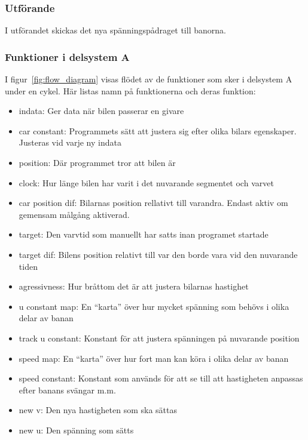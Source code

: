     \subsubsection{Utförande}

    	I utförandet skickas det nya spänningspådraget till banorna. 
	

    \subsubsection{Funktioner i delsystem A}
	I figur~\ref{fig:flow_diagram}  visas flödet av de funktioner som sker i delsystem A under en cykel.
	Här listas namn på funktionerna och deras funktion:
	\begin{itemize}
 		\item indata: Ger data när bilen passerar en givare
		\item car constant: Programmets sätt att justera sig efter olika bilars egenskaper. Justeras vid varje ny indata
 		\item position: Där programmet tror att bilen är
 		\item clock: Hur länge bilen har varit i det nuvarande segmentet och varvet
		\item car position dif: Bilarnas position rellativt till varandra. Endast aktiv om gemensam målgång aktiverad.
		\item target: Den varvtid som manuellt har satts inan programet startade
		\item target dif: Bilens position relativt till var den borde vara vid den nuvarande tiden
		\item agressivness: Hur bråttom det är att justera bilarnas hastighet 
		\item u constant map: En ``karta'' över hur mycket spänning som behövs i olika delar av banan
		\item track u constant: Konstant för att justera spänningen på nuvarande position
		\item speed map: En ``karta'' över hur fort man kan köra i olika delar av banan		
		\item speed constant: Konstant som används för att se till att hastigheten anpassas efter banans svängar m.m.
		\item new v: Den nya hastigheten som ska sättas
		\item new u: Den spänning som sätts
	\end{itemize}

